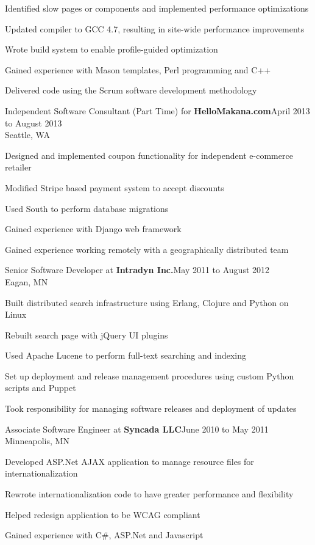 \documentclass[letterpaper]{article}
\newenvironment{resume-list}
{\begin{itemize}
 \setlength{\itemsep}{0pt}
 \setlength{\parskip}{0pt}}
{\end{itemize}}
\begin{document}
\begin{resume-list}
\item Identified slow pages or components and implemented performance optimizations
\item Updated compiler to GCC 4.7, resulting in site-wide performance improvements
\item Wrote build system to enable profile-guided optimization
\item Gained experience with Mason templates, Perl programming and C++
\item Delivered code using the Scrum software development methodology
\end{resume-list}
\noindent Independent Software Consultant (Part Time) for {\bfseries HelloMakana.com}\dotfill April 2013 to August 2013\\
Seattle, WA
\begin{resume-list}
\item Designed and implemented coupon functionality for independent e-commerce retailer
\item Modified Stripe based payment system to accept discounts
\item Used South to perform database migrations
\item Gained experience with Django web framework
\item Gained experience working remotely with a geographically distributed team
\end{resume-list}
\noindent Senior Software Developer at {\bfseries Intradyn Inc.}\dotfill May 2011 to August 2012\\
Eagan, MN
\begin{resume-list}
\item Built distributed search infrastructure using Erlang, Clojure and Python on Linux
\item Rebuilt search page with jQuery UI plugins
\item Used Apache Lucene to perform full-text searching and indexing
\item Set up deployment and release management procedures using custom Python scripts and Puppet
\item Took responsibility for managing software releases and deployment of updates
\end{resume-list}
\pagebreak
\noindent Associate Software Engineer at {\bfseries Syncada LLC}\dotfill June 2010 to May 2011\\
Minneapolis, MN
\begin{resume-list}
\item Developed ASP.Net AJAX application to manage resource files for internationalization
\item Rewrote internationalization code to have greater performance and flexibility
\item Helped redesign application to be WCAG compliant
\item Gained experience with C\#, ASP.Net and Javascript
\end{resume-list}
\end{document}
